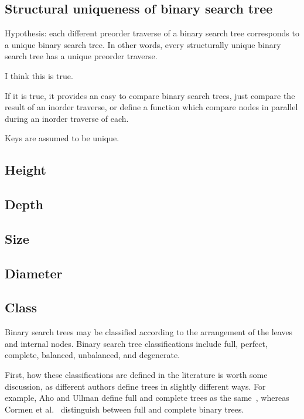 \subsection{Structural uniqueness of binary search tree}

Hypothesis: each different preorder traverse of a binary search
tree corresponds to a unique binary search tree. In other words,
every structurally unique binary search
tree has a unique preorder traverse.

I think this is true.

If it is true, it provides an easy to compare binary
search trees, just compare the result of an inorder
traverse, or define a function which compare nodes in
parallel during an inorder traverse of each.

Keys are assumed to be unique.

\subsection{Height}

\subsection{Depth}

\subsection{Size}

\subsection{Diameter}

\subsection{Class}

Binary search trees may be classified according to the
arrangement of the leaves and internal nodes.
Binary search tree classifications include
full, perfect, complete, balanced, unbalanced, and degenerate.

First, how these classifications are defined in the literature is
worth some discussion, as different authors define trees in slightly
different ways. For example, Aho and Ullman define full and complete
trees as the same~\cite[p. 257]{aho:av:1992}, whereas Cormen
et al.~\cite[p. 1178]{cormen:th2009} distinguish between full and
complete binary trees.

